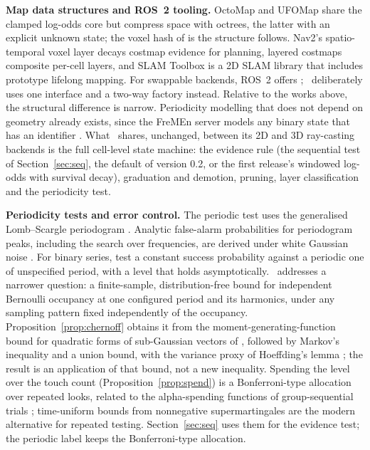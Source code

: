 \noindent\textbf{Map data structures and ROS~2 tooling.} OctoMap \citep{hornung2013octomap} and UFOMap \citep{duberg2020ufomap} share the clamped log-odds core but compress space with octrees, the latter with an explicit unknown state; the voxel hash of \citet{niessner2013hashing} is the structure  follows. Nav2's spatio-temporal voxel layer \citep{macenski2020stvl} decays costmap evidence for planning, layered costmaps \citep{lu2014layered} composite per-cell layers, and SLAM Toolbox \citep{macenski2021slamtoolbox} is a 2D SLAM library that includes prototype lifelong mapping. For swappable backends, ROS~2 offers  \citep{ros2pluginlib}; \sname\ deliberately uses one interface and a two-way factory instead. Relative to the works above, the structural difference is narrow. Periodicity modelling that does not depend on geometry already exists, since the FreMEn server models any binary state that has an identifier \citep{fremenrepo}. What \sname\ shares, unchanged, between its 2D and 3D ray-casting backends is the full cell-level state machine: the evidence rule (the sequential test of Section~\ref{sec:seq}, the default of version 0.2, or the first release's windowed log-odds with survival decay), graduation and demotion, pruning, layer classification and the periodicity test.

\noindent\textbf{Periodicity tests and error control.} The periodic test uses the generalised Lomb--Scargle periodogram \citep{zechmeister2009gls}. Analytic false-alarm probabilities for periodogram peaks, including the search over frequencies, are derived under white Gaussian noise \citep{baluev2008}. For binary series, \citet{schmidtke2026binary} test a constant success probability against a periodic one of unspecified period, with a level that holds asymptotically. \sname\ addresses a narrower question: a finite-sample, distribution-free bound for independent Bernoulli occupancy at one configured period and its harmonics, under any sampling pattern fixed independently of the occupancy. Proposition~\ref{prop:chernoff} obtains it from the moment-generating-function bound for quadratic forms of sub-Gaussian vectors of \citet[Remark~2]{hsu2012tail}, followed by Markov's inequality and a union bound, with the variance proxy of Hoeffding's lemma \citep{hoeffding1963}; the result is an application of that bound, not a new inequality. Spending the level over the touch count (Proposition~\ref{prop:spend}) is a Bonferroni-type allocation over repeated looks, related to the alpha-spending functions of group-sequential trials \citep{lan1983discrete}; time-uniform bounds from nonnegative supermartingales \citep{howard2020timeuniform} are the modern alternative for repeated testing. Section~\ref{sec:seq} uses them for the evidence test; the periodic label keeps the Bonferroni-type allocation.
